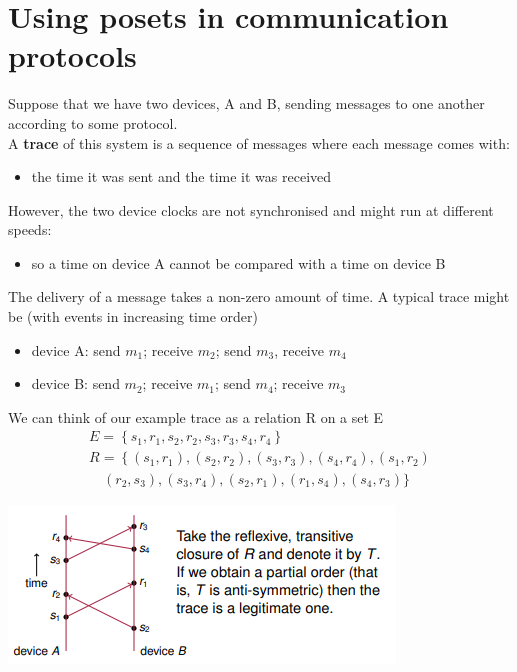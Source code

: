 \documentclass{article}[18pt]
\begin{document}
\section{Using posets in communication protocols}
Suppose that we have two devices, A and B, sending messages to one another according to some protocol.\\
A \textbf{trace} of this system is a sequence of messages where each message comes with:
\begin{itemize}
	\item the time it was sent and the time it was received
\end{itemize} 
However, the two device clocks are not synchronised and might run at different speeds:
\begin{itemize}
	\item so a time on device A cannot be compared with a time on device B
\end{itemize}
The delivery of a message takes a non-zero amount of time. A typical trace might be (with events in increasing time order)
\begin{itemize}
	\item device A: send $m_1$; receive $m_2$; send $m_3$, receive $m_4$
	\item device B: send $m_2$; receive $m_1$; send $m_4$; receive $m_3$
\end{itemize}
We can think of our example trace as a relation R on a set E
 $$\begin{array} { l } { E = \left\{ s _ { 1 } , r _ { 1 } , s _ { 2 } , r _ { 2 } , s _ { 3 } , r _ { 3 } , s _ { 4 } , r _ { 4 } \right\} } \\ { R = \left\{ \left( s _ { 1 } , r _ { 1 } \right) , \left( s _ { 2 } , r _ { 2 } \right) , \left( s _ { 3 } , r _ { 3 } \right) , \left( s _ { 4 } , r _ { 4 } \right) , \left( s _ { 1 } , r _ { 2 } \right) \right. } \\ { \quad \left( r _ { 2 } , s _ { 3 } \right) , \left( s _ { 3 } , r _ { 4 } \right) , \left( s _ { 2 } , r _ { 1 } \right) , \left( r _ { 1 } , s _ { 4 } \right) , \left( s _ { 4 } , r _ { 3 } \right) \} } \end{array}$$
 \begin{center}
 	\includegraphics[scale=0.7]{coms}
 \end{center}
\end{document}
